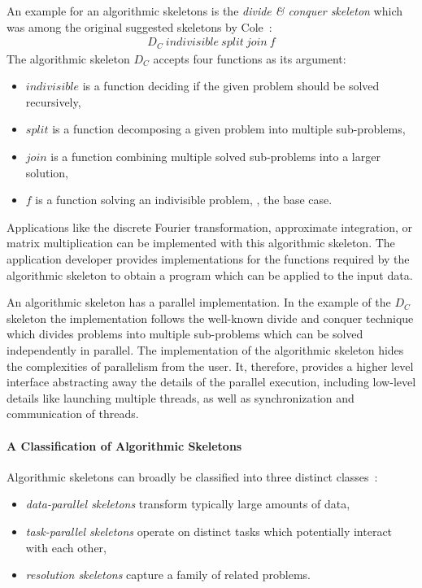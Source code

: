 An example for an algorithmic skeletons is the \emph{divide \& conquer skeleton} which was among the original suggested skeletons by Cole~\cite{Cole1991}:
\begin{align*}
  D_C\ indivisible\ split\ join\ f%
\end{align*}
The algorithmic skeleton $D_C$ accepts four functions as its argument:
\begin{itemize}
  \item $indivisible$ is a function deciding if the given problem should be solved recursively,
  \item $split$ is a function decomposing a given problem into multiple sub-problems,
  \item $join$ is a function combining multiple solved sub-problems into a larger solution,
  \item $f$ is a function solving an indivisible problem, \ie, the base case.
\end{itemize}

Applications like the discrete Fourier transformation, approximate integration, or matrix multiplication can be implemented with this algorithmic skeleton.
The application developer provides implementations for the functions required by the algorithmic skeleton to obtain a program which can be applied to the input data.

An algorithmic skeleton has a parallel implementation.
In the example of the $D_C$ skeleton the implementation follows the well-known divide and conquer technique which divides problems into multiple sub-problems which can be solved independently in parallel.
The implementation of the algorithmic skeleton hides the complexities of parallelism from the user.
It, therefore, provides a higher level interface abstracting away the details of the parallel execution, including low-level details like launching multiple threads, as well as synchronization and communication of threads.

\paragraph{A Classification of Algorithmic Skeletons}
Algorithmic skeletons can broadly be classified into three distinct classes~\cite{Gonzalez-VelezL10}:
\begin{itemize}
  \item \emph{data-parallel skeletons} transform typically large amounts of data,
  \item \emph{task-parallel skeletons} operate on distinct tasks which potentially interact with each other,
  \item \emph{resolution skeletons} capture a family of related problems.
\end{itemize}

